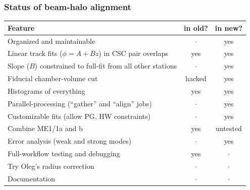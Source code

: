 \documentclass[compress]{beamer}
\begin{document}

\small

\begin{frame}
\frametitle{Status of beam-halo alignment}

\renewcommand{\arraystretch}{1.5}
\begin{tabular}{l c c}
Feature & in old? & in new? \\\hline
Organized and maintainable & $\cdot$ & yes \\
Linear track fits ($\phi = A + B z$) in CSC pair overlaps & yes & yes \\
Slope ($B$) constrained to full-fit from all other stations & $\cdot$ & yes \\
Fiducial chamber-volume cut & hacked & yes \\
Histograms of everything & yes & yes \\
Parallel-processing (``gather'' and ``align'' jobs) & $\cdot$ & yes \\
Customizable fits (allow PG, HW constraints) & $\cdot$ & yes \\
Combine ME1/1a and b & yes & untested \\
Error analysis (weak and strong modes) & $\cdot$ & yes \\
Full-workflow testing and debugging & yes & $\cdot$ \\
Try Oleg's radius correction & $\cdot$ & $\cdot$ \\
Documentation & $\cdot$ & $\cdot$ \\
\end{tabular}
\end{frame}

\end{document}
